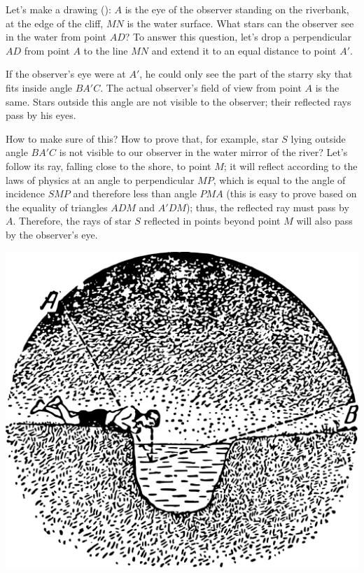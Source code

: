 Let's make a drawing (): $A$ is the eye of the observer standing on the riverbank, at the edge of the cliff, $MN$ is the water surface. What stars can the observer see in the water from point $AD$? To answer this question, let's drop a perpendicular $AD$ from point $A$ to the line $MN$ and extend it to an equal distance to point $A'$. 

If the observer's eye were at $A'$, he could only see the part of the starry sky that fits inside angle $BA'C$. The actual observer's field of view from point $A$ is the same. Stars outside this angle are not visible to the observer; their reflected rays pass by his eyes.


How to make sure of this? How to prove that, for example, star $S$ lying outside angle $BA'C$ is not visible to our observer in the water mirror of the river? Let's follow its ray, falling close to the shore, to point $M$; it will reflect according to the laws of physics at an angle to perpendicular $MP$, which is equal to the angle of incidence $SMP$ and therefore less than angle $PMA$ (this is easy to prove based on the equality of triangles $ADM$ and $A'DM$); thus, the reflected ray must pass by $A$. Therefore, the rays of star $S$ reflected in points beyond point $M$ will also pass by the observer's eye.
\begin{marginfigure}%
\centering
\includegraphics[width=1.\textwidth]{figures/ch-02/fig-055.pdf}
\end{marginfigure}



